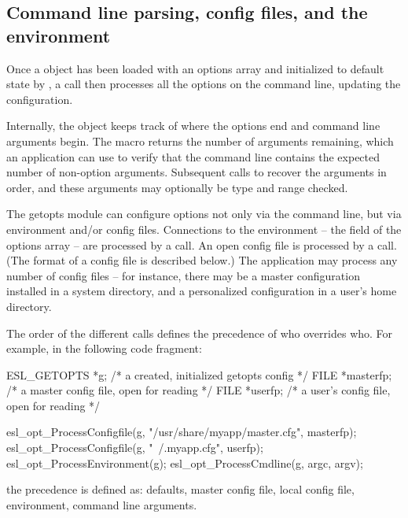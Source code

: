 \subsection{Command line parsing, config files, and the environment}

Once a  object has been loaded with an options
array and initialized to default state by
, a 
call then processes all the options on the command line, updating the
configuration. 

Internally, the object keeps track of where the options end and
command line arguments begin. The macro 
returns the number of arguments remaining, which an application can
use to verify that the command line contains the expected number of
non-option arguments.  Subsequent calls to
 recover the arguments in order, and
these arguments may optionally be type and range checked.

The getopts module can configure options not only via the command
line, but via environment and/or config files.  Connections to the
environment -- the  field of the options array -- are
processed by a  call.  An open
config file is processed by a 
call. (The format of a config file is described below.) The
application may process any number of config files -- for instance,
there may be a master configuration installed in a system directory,
and a personalized configuration in a user's home directory.

The order of the different  calls defines the
precedence of who overrides who. For example, in the following code
fragment:

\begin{cchunk}
   ESL_GETOPTS *g;        /* a created, initialized getopts config  */
   FILE *masterfp;        /* a master config file, open for reading */
   FILE *userfp;          /* a user's config file, open for reading */

   esl_opt_ProcessConfigfile(g, "/usr/share/myapp/master.cfg", masterfp);
   esl_opt_ProcessConfigfile(g, "~/.myapp.cfg",                userfp);
   esl_opt_ProcessEnvironment(g);
   esl_opt_ProcessCmdline(g, argc, argv);
\end{cchunk}

the precedence is defined as: defaults, master config file, local
config file, environment, command line arguments. 


